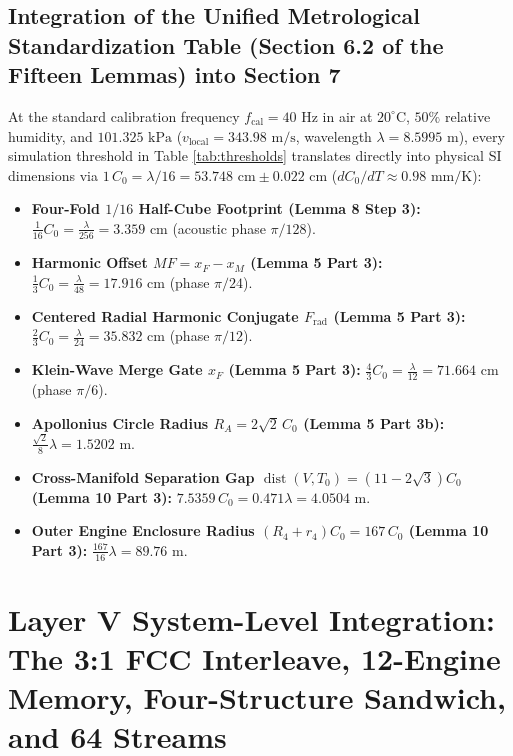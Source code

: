 \documentclass[11pt, a4paper]{article}
\begin{document}
\subsection{Integration of the Unified Metrological Standardization Table (Section 6.2 of the Fifteen Lemmas) into Section 7}
At the standard calibration frequency $f_{\text{cal}} = 40\text{ Hz}$ in air at $20^\circ\text{C}$, $50\%$ relative humidity, and $101.325\text{ kPa}$ ($v_{\text{local}} = 343.98\text{ m/s}$, wavelength $\lambda = 8.5995\text{ m}$), every simulation threshold in Table \ref{tab:thresholds} translates directly into physical SI dimensions via $1\,C_0 = \lambda/16 = 53.748\text{ cm} \pm 0.022\text{ cm}$ ($dC_0/dT \approx 0.98\text{ mm/K}$):
\begin{itemize}
    \item \textbf{Four-Fold $1/16$ Half-Cube Footprint (Lemma 8 Step 3):} $\frac{1}{16}C_0 = \frac{\lambda}{256} = 3.359\text{ cm}$ (acoustic phase $\pi/128$).
    \item \textbf{Harmonic Offset $MF = x_F - x_M$ (Lemma 5 Part 3):} $\frac{1}{3}C_0 = \frac{\lambda}{48} = 17.916\text{ cm}$ (phase $\pi/24$).
    \item \textbf{Centered Radial Harmonic Conjugate $F_{\text{rad}}$ (Lemma 5 Part 3):} $\frac{2}{3}C_0 = \frac{\lambda}{24} = 35.832\text{ cm}$ (phase $\pi/12$).
    \item \textbf{Klein-Wave Merge Gate $x_F$ (Lemma 5 Part 3):} $\frac{4}{3}C_0 = \frac{\lambda}{12} = 71.664\text{ cm}$ (phase $\pi/6$).
    \item \textbf{Apollonius Circle Radius $R_A = 2\sqrt{2}\,C_0$ (Lemma 5 Part 3b):} $\frac{\sqrt{2}}{8}\lambda = 1.5202\text{ m}$.
    \item \textbf{Cross-Manifold Separation Gap $\operatorname{dist}(V, T_0) = (11 - 2\sqrt{3})C_0$ (Lemma 10 Part 3):} $7.5359\,C_0 = 0.471\lambda = 4.0504\text{ m}$.
    \item \textbf{Outer Engine Enclosure Radius $(R_4 + r_4)C_0 = 167\,C_0$ (Lemma 10 Part 3):} $\frac{167}{16}\lambda = 89.76\text{ m}$.
\end{itemize}

\section{Layer V System-Level Integration: The 3:1 FCC Interleave, 12-Engine Memory, Four-Structure Sandwich, and 64 Streams}
\end{document}
